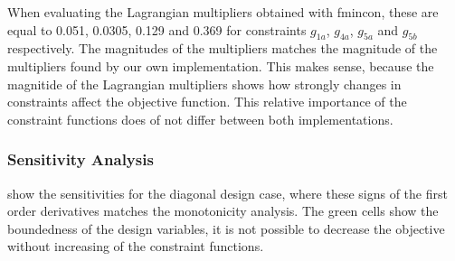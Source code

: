 When evaluating the Lagrangian multipliers obtained with fmincon, these are equal to 0.051, 0.0305, 0.129 and 0.369 for constraints $g_{1a}$, $g_{4a}$, $g_{5a}$ and $g_{5b}$ respectively. 
The magnitudes of the multipliers matches the magnitude of the multipliers found by our own implementation. 
This makes sense, because the magnitide of the Lagrangian multipliers shows how strongly changes in constraints affect the objective function. 
This relative importance of the constraint functions does of not differ between both implementations.

\subsubsection{Sensitivity Analysis}
 show the sensitivities for the diagonal design case, where these signs of the first order derivatives matches the monotonicity analysis. The green cells show the boundedness of the design variables, it is not possible to decrease the objective without increasing of the constraint functions.

